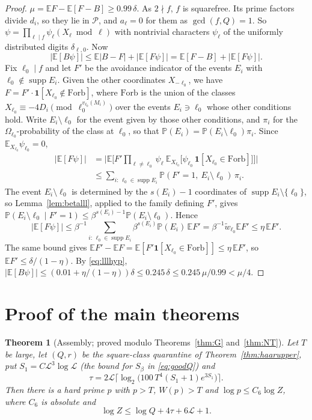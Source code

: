 \documentclass[11pt,reqno]{amsart}
\newtheorem{theorem}{Theorem}[section]
\theoremstyle{definition}
\newcommand{\cP}{\mathcal P}
\newcommand{\Lc}{\mathcal L}
\newcommand{\E}{\mathbb E}
\newcommand{\PP}{\mathbb P}
\newcommand{\supp}{\operatorname{supp}}
\begin{document}
\begin{proof}
$\mu=\E F-\E[F-B]\ge0.99\,\delta$.  As $2\nmid f$, $f$ is squarefree.  Its prime
factors divide $d_i$, so they lie in $\cP$, and $a_\ell=0$ for them as
$\gcd(f,Q)=1$.  So $\psi=\prod_{\ell\mid f}\psi_\ell(X_\ell\bmod\ell)$ with nontrivial
characters $\psi_\ell$ of the uniformly distributed digits $\delta_{\ell,0}$.  Now
\[
 |\E[B\psi]|\le\E|B-F|+|\E[F\psi]|=\E[F-B]+|\E[F\psi]| .
\]
Fix $\ell_0\mid f$ and let $F'$ be the avoidance indicator of the events $E_i$
with $\ell_0\notin\supp E_i$.  Given the other coordinates $X_{-\ell_0}$, we have
$F=F'\cdot\mathbf 1[X_{\ell_0}\notin\mathrm{Forb}]$, where $\mathrm{Forb}$ is the union of the
classes $X_{\ell_0}\equiv-4D_i\pmod{\ell_0^{v_{\ell_0}(M_i)}}$ over the events $E_i\ni\ell_0$
whose other conditions hold.  Write $E_i\setminus\ell_0$ for the event given by those
other conditions, and $\pi_i$ for the $\Omega_{\ell_0}$-probability of the class at $\ell_0$,
so that $\PP(E_i)=\PP(E_i\setminus\ell_0)\pi_i$.  Since $\E_{X_{\ell_0}}\psi_{\ell_0}=0$,
\begin{align*}
 |\E[F\psi]|&=\Big|\E\Big[F'\textstyle\prod_{\ell\ne\ell_0}\psi_\ell\ \E_{X_{\ell_0}}\big[\psi_{\ell_0}\,\mathbf 1[X_{\ell_0}\in\mathrm{Forb}]\big]\Big]\Big|\\
 &\le\sum_{i:\,\ell_0\in\supp E_i}\PP(F'=1,\ E_i\setminus\ell_0)\,\pi_i .
\end{align*}
The event $E_i\setminus\ell_0$ is determined by the $s(E_i)-1$ coordinates of
$\supp E_i\setminus\{\ell_0\}$, so Lemma~\ref{lem:betalll}, applied to the family
defining $F'$, gives
$\PP(E_i\setminus\ell_0\mid F'=1)\le\beta^{s(E_i)-1}\PP(E_i\setminus\ell_0)$.  Hence
\[
 |\E[F\psi]|\le\beta^{-1}\sum_{i:\,\ell_0\in\supp E_i}\beta^{s(E_i)}\PP(E_i)\,\E F'=\beta^{-1}\tilde w_{\ell_0}\E F'\le\eta\,\E F' .
\]
The same bound gives $\E F'-\E F=\E[F'\mathbf 1[X_{\ell_0}\in\mathrm{Forb}]]\le\eta\,\E F'$, so
$\E F'\le\delta/(1-\eta)$.  By \eqref{eq:lllhyp},
$|\E[B\psi]|\le(0.01+\eta/(1-\eta))\delta\le0.245\,\delta\le0.245\,\mu/0.99<\mu/4$.
\end{proof}

\section{Proof of the main theorems}\label{sec:proof}

\begin{theorem}[Assembly; proved modulo Theorems~\ref{thm:G} and~\ref{thm:NT}]\label{thm:assembly}
Let $T$ be large, let $(Q,r)$ be the square-class quarantine of
Theorem~\ref{thm:haarupper}, put $S_1=C\Lc^3\log\Lc$ (the bound for $S_\beta$ in
\eqref{eq:goodQ}) and
\[
 \tau=2\Lc\big\lceil\log_2\big(100\,T^4(S_1+1)e^{3S_1}\big)\big\rceil .
\]
Then there is a hard prime $p$ with $p>T$, $W(p)>T$ and
$\log p\le C_6\log Z$, where $C_6$ is absolute and
\[
 \log Z\le\log Q+4\tau+6\Lc+1 .
\]
\end{theorem}
\end{document}
